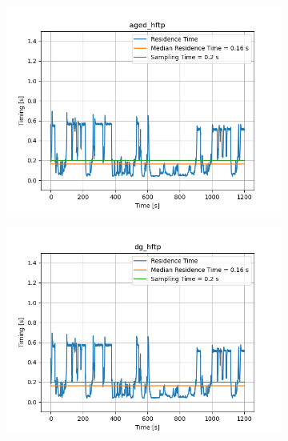 \begin{figure}[H]
\begin{minipage}{0.49\textwidth}
\begin{figure}[H]
        \end{figure}
    \end{minipage}
    \begin{minipage}{0.49\textwidth}
        \begin{figure}[H]
            \includegraphics[width=\textwidth]{figs/res_time/aged_hftp_timing_stuff.png}
        \end{figure}
    \end{minipage}
    \begin{minipage}{0.49\textwidth}
        \begin{figure}[H]
            \includegraphics[width=\textwidth]{figs/res_time/dg_hftp_timing_stuff.png}
        \end{figure}

\end{minipage}
\end{figure}
